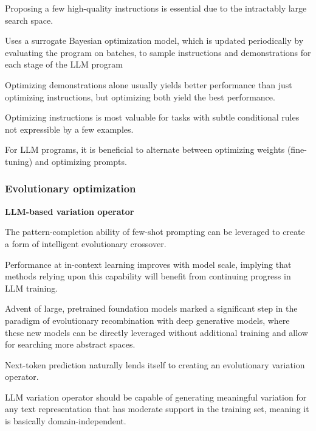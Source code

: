 Proposing a few high-quality instructions is essential due to the intractably large search space. \cite{opsahlong2024optimizinginstructionsdemonstrationsmultistage}

Uses a surrogate Bayesian optimization model, which is updated periodically by evaluating the program on batches, to sample instructions and demonstrations for each stage of the LLM program \cite{opsahlong2024optimizinginstructionsdemonstrationsmultistage}

Optimizing demonstrations alone usually yields better performance than just optimizing instructions, but optimizing both yield the best performance. \cite{opsahlong2024optimizinginstructionsdemonstrationsmultistage}

Optimizing instructions is most valuable for tasks with subtle conditional rules not expressible by a few examples.  \cite{opsahlong2024optimizinginstructionsdemonstrationsmultistage}

For LLM programs, it is beneficial to alternate between optimizing weights (fine-tuning) and optimizing prompts. \cite{soylu2024finetuningpromptoptimizationgreat}

\subsubsection{Evolutionary optimization}
\textbf{LLM-based variation operator}

The pattern-completion ability of few-shot prompting can be leveraged to create a form of intelligent evolutionary crossover. \cite{meyerson2024languagemodelcrossovervariation}

Performance at in-context learning improves with model scale, implying that methods relying upon this capability will benefit from continuing progress in LLM training. \cite{meyerson2024languagemodelcrossovervariation}

Advent of large, pretrained foundation models marked a significant step in the paradigm of evolutionary recombination with deep generative models, where these new models can be directly leveraged without additional training and allow for searching more abstract spaces. \cite{meyerson2024languagemodelcrossovervariation}

Next-token prediction naturally lends itself to creating an evolutionary variation operator. \cite{meyerson2024languagemodelcrossovervariation}

LLM variation operator should be capable of generating meaningful variation for any text representation that has moderate support in the training set, meaning it is basically domain-independent. \cite{meyerson2024languagemodelcrossovervariation}

